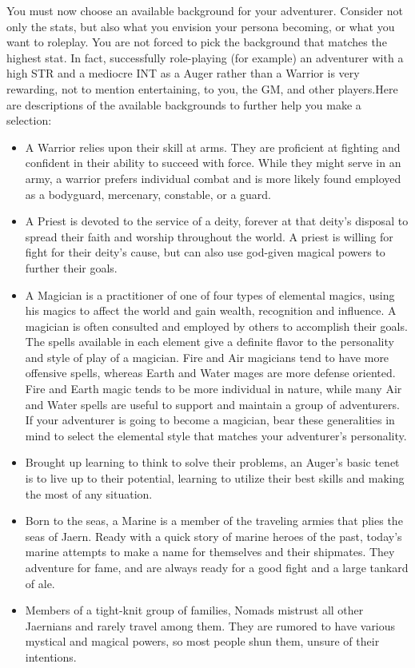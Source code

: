 You must now choose an available background for your adventurer. Consider not only the stats, but also what you envision your persona becoming, or what you want to roleplay. You are not forced to pick the background that matches the highest stat. In fact, successfully role-playing (for example) an adventurer with a high STR and a mediocre INT as a Auger rather than a Warrior is very rewarding, not to mention entertaining, to you, the GM, and other players.Here are descriptions of the available backgrounds to further help you make a selection:\begin{itemize}
\item {A Warrior relies upon their skill at arms. They are proficient at fighting and confident in their ability to succeed with force. While they might serve in an army, a warrior prefers individual combat and is more likely found employed as a bodyguard, mercenary, constable, or a guard.}

\item A Priest is devoted to the service of a deity, forever at that deity's disposal to spread their faith and worship throughout the world. A priest is willing for fight for their deity's cause, but can also use god-given magical powers to further their goals.

\item A Magician is a practitioner of one of four types of elemental magics, using his magics to affect the world and gain wealth, recognition and influence. A magician is often consulted and employed by others to accomplish their goals.
The spells available in each element give a definite flavor to the personality and style of play of a magician. Fire and Air magicians tend to have more offensive spells, whereas Earth and Water mages are more defense oriented. Fire and Earth magic tends to be more individual in nature, while many Air and Water spells are useful to support and maintain a group of adventurers. If your adventurer is going to become a magician, bear these generalities in mind to select the elemental style that matches your adventurer's personality.

\item Brought up learning to think to solve their problems, an Auger's basic tenet is to live up to their potential, learning to utilize their best skills and making the most of any situation.
\item Born to the seas, a Marine is a member of the traveling armies that plies the seas of Jaern. Ready with a quick story of marine heroes of the past, today's marine attempts to make a name for themselves and their shipmates. They adventure for fame, and are always ready for a good fight and a large tankard of ale.

\item Members of a tight-knit group of families, Nomads mistrust all other Jaernians and rarely travel among them. They are rumored to have various mystical and magical powers, so most people shun them, unsure of their intentions.
\end{itemize}

